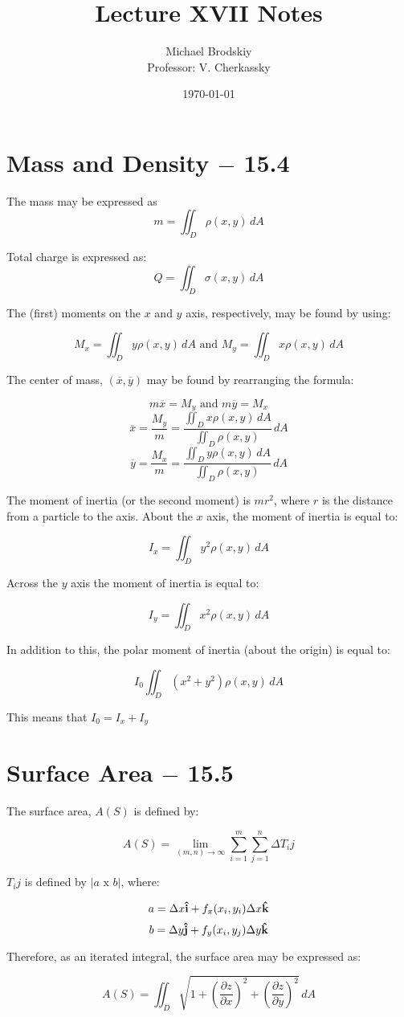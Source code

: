\documentclass[12pt]{article}
\title{Lecture XVII Notes}
\date{\today}
\author{Michael Brodskiy\\ \small Professor: V. Cherkassky}
\begin{document}
\maketitle

\section{Mass and Density $-$ 15.4}

The mass may be expressed as 
$$m=\iint_D \rho(x,y)\,dA$$

Total charge is expressed as:
$$Q=\iint_D \sigma(x,y)\,dA$$

The (first) moments on the $x$ and $y$ axis, respectively, may be found by using:

$$M_x=\iint_D y\rho(x,y)\,dA\text{ and }M_y=\iint_D x\rho(x,y)\,dA$$

The center of mass, $(\overline{x},\overline{y})$ may be found by rearranging the formula:

$$m\overline{x}=M_y\text{ and } m\overline{y}=M_x$$
$$\overline{x}=\frac{M_y}{m}=\frac{\iint_D x\rho(x,y)\,dA}{\iint_D \rho(x,y)}\,dA$$
  $$\overline{y}=\frac{M_x}{m}=\frac{\iint_D y\rho(x,y)\,dA}{\iint_D \rho(x,y)}\,dA$$

  The moment of inertia (or the second moment) is $mr^2$, where $r$ is the distance from a particle to the axis. About the $x$ axis, the moment of inertia is equal to:

  $$I_x = \iint_D y^2\rho(x,y)\,dA$$

  Across the $y$ axis the moment of inertia is equal to:

  $$I_y=\iint_D x^2\rho(x,y)\,dA$$

  In addition to this, the polar moment of inertia (about the origin) is equal to:

  $$I_0\iint_D (x^2+y^2)\rho(x,y)\,dA$$

  This means that $I_0=I_x+I_y$

  \section{Surface Area $-$ 15.5}

  The surface area, $A(S)$ is defined by:

  $$A(S)=\lim_{(m,n)\to\infty}\sum_{i=1}^m\sum_{j=1}^n \Delta T_ij$$

  $T_ij$ is defined by $|a\text{ x }b|$, where:

  $$a=\Delta x\bold{\hat{i}} + f_x(x_i,y_i)\Delta x \bold{\hat{k}}$$
  $$b=\Delta y\bold{\hat{j}} + f_y(x_i,y_j)\Delta y \bold{\hat{k}}$$

  Therefore, as an iterated integral, the surface area may be expressed as:

  $$A(S)=\iint_D \sqrt{1+\left(\frac{\partial z}{\partial x}\right)^2+\left(\frac{\partial z}{\partial y}\right)^2}\,dA$$
\end{document}
